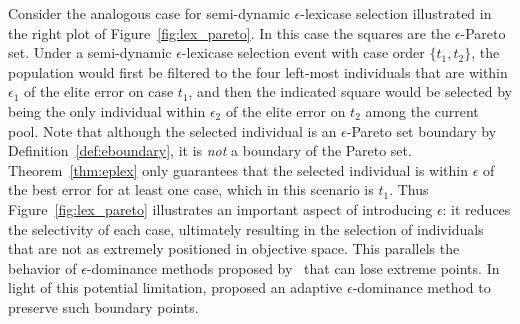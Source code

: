 \documentclass[twoside]{article}
\newcommand{\edit}[1]{{\color{red} #1}}
\begin{document}
Consider the analogous case for semi-dynamic $\epsilon$-lexicase selection illustrated in the right plot of Figure~\ref{fig:lex_pareto}. In this case the squares are the $\epsilon$-Pareto set. Under a semi-dynamic $\epsilon$-lexicase selection event with case order $\{t_1, t_2\}$, the population would first be filtered to the four left-most individuals that are within $\epsilon_1$ of the elite error on case $t_1$, and then the indicated square would be selected by being the only individual within $\epsilon_2$ of the elite error on $t_2$ among the current pool. Note that although the selected individual is an $\epsilon$-Pareto set boundary by Definition~\ref{def:eboundary}, it is {\it not} a boundary of the Pareto set. Theorem~\ref{thm:eplex} only guarantees that the selected individual is within $\epsilon$ of the best error for at least one case, which in this scenario is $t_1$. Thus Figure~\ref{fig:lex_pareto} illustrates an important aspect of introducing $\epsilon$: it reduces the selectivity of each case, ultimately resulting in the selection of individuals that are not as extremely positioned in objective space. \edit{This parallels the behavior of $\epsilon$-dominance methods proposed by~\cite{laumanns_archiving_2002} that can lose extreme points. In light of this potential limitation, \cite{hernandez-diaz_pareto-adaptive_2007} proposed an adaptive $\epsilon$-dominance method to preserve such boundary points.}
\end{document}
